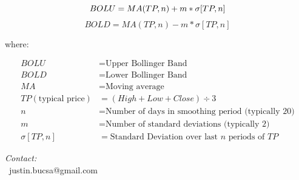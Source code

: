 \documentclass[9pt,a4paper,twoside]{tau}
\begin{document}
        \begin{equation}
        BOLU = MA(TP, n) + m * \sigma[TP, n] \\
        \end{equation}
        \begin{equation}
        BOLD = MA(TP, n) - m * \sigma[TP, n] 
        \end{equation}
        
        where:
        
        \begin{align*}
        BOLU &= \text{Upper Bollinger Band} \\
        BOLD &= \text{Lower Bollinger Band} \\
        MA &= \text{Moving average} \\
        TP (\text{typical price}) &= (High + Low + Close) \div 3 \\
        n &= \text{Number of days in smoothing period (typically 20)} \\
        m &= \text{Number of standard deviations (typically 2)} \\
        \sigma[TP, n] &= \text{Standard Deviation over last } n \text{ periods of } TP
        \end{align*}
    

       

					

\printbibliography


\begin{center}
	
	\vskip10pt
	\textit{Contact:} \\
	\faEnvelope[regular]\ justin.bucsa@gmail.com \\

\end{center}

\end{document}

